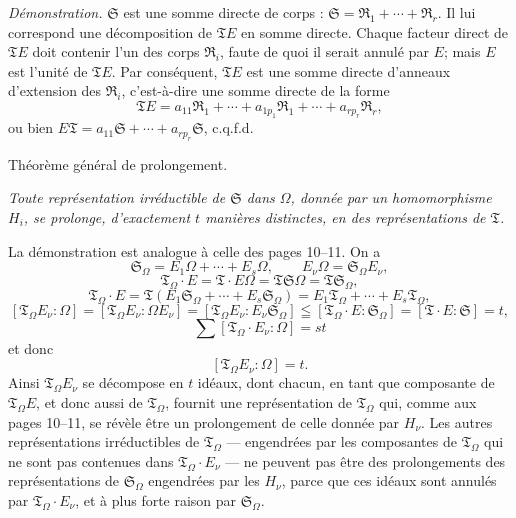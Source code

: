 \emph{Démonstration.} \(\mathfrak S\) est une somme directe de corps : \(\mathfrak S=\mathfrak R_1+\cdots+\mathfrak R_r\). Il lui correspond une décomposition de \(\mathfrak T E\) en somme directe. Chaque facteur direct de \(\mathfrak T E\) doit contenir l'un des corps \(\mathfrak R_i\), faute de quoi il serait annulé par \(E\); mais \(E\) est l'unité de \(\mathfrak T E\). Par conséquent, \(\mathfrak T E\) est une somme directe d'anneaux d'extension des \(\mathfrak R_i\), c'est-à-dire une somme directe de la forme
\[
\mathfrak T E=a_{11}\mathfrak R_1+\cdots+a_{1p_1}\mathfrak R_1+\cdots+a_{rp_r}\mathfrak R_r,
\]
ou bien \(E\mathfrak T=a_{11}\mathfrak S+\cdots+a_{rp_r}\mathfrak S\), c.q.f.d.

\begin{center}
Théorème général de prolongement.
\end{center}

\emph{Toute représentation irréductible de \(\mathfrak S\) dans \(\Omega\), donnée par un homomorphisme \(H_i\), se prolonge, d'exactement \(t\) manières distinctes, en des représentations de \(\mathfrak T\).}

La démonstration est analogue à celle des pages 10--11. On a
\[
\mathfrak S_\Omega=E_1\Omega+\cdots+E_s\Omega,\qquad
E_\nu\Omega=\mathfrak S_\Omega E_\nu,
\]
\[
\mathfrak T_\Omega\cdot E=\mathfrak T\cdot E\Omega
=\mathfrak T\mathfrak S\Omega=\mathfrak T\mathfrak S_\Omega,
\]
\[
\mathfrak T_\Omega\cdot E
=\mathfrak T(E_1\mathfrak S_\Omega+\cdots+E_s\mathfrak S_\Omega)
=E_1\mathfrak T_\Omega+\cdots+E_s\mathfrak T_\Omega,
\]
\[
[\mathfrak T_\Omega E_\nu:\Omega]
=[\mathfrak T_\Omega E_\nu:\Omega E_\nu]
=[\mathfrak T_\Omega E_\nu:E_\nu\mathfrak S_\Omega]
\leqq[\mathfrak T_\Omega\cdot E:\mathfrak S_\Omega]
=[\mathfrak T\cdot E:\mathfrak S]=t,
\]
\[
\sum[\mathfrak T_\Omega\cdot E_\nu:\Omega]=st
\]
et donc
\[
[\mathfrak T_\Omega E_\nu:\Omega]=t.
\]
Ainsi \(\mathfrak T_\Omega E_\nu\) se décompose en \(t\) idéaux, dont chacun, en tant que composante de \(\mathfrak T_\Omega E\), et donc aussi de \(\mathfrak T_\Omega\), fournit une représentation de \(\mathfrak T_\Omega\) qui, comme aux pages 10--11, se révèle être un prolongement de celle donnée par \(H_\nu\). Les autres représentations irréductibles de \(\mathfrak T_\Omega\) --- engendrées par les composantes de \(\mathfrak T_\Omega\) qui ne sont pas contenues dans \(\mathfrak T_\Omega\cdot E_\nu\) --- ne peuvent pas être des prolongements des représentations de \(\mathfrak S_\Omega\) engendrées par les \(H_\nu\), parce que ces idéaux sont annulés par \(\mathfrak T_\Omega\cdot E_\nu\), et à plus forte raison par \(\mathfrak S_\Omega\).
